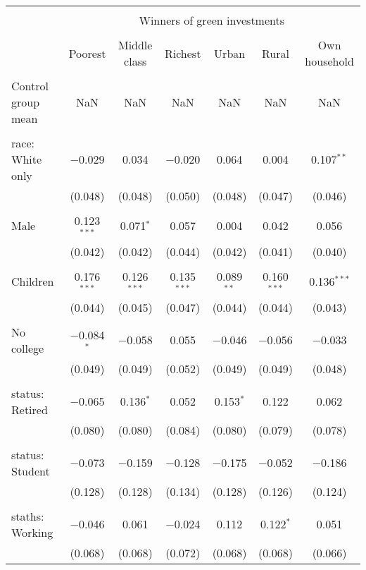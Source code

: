 
\begin{tabular}{@{\extracolsep{5pt}}lcccccc} 
\\[-1.8ex]\hline 
\hline \\[-1.8ex] 
 & \multicolumn{6}{c}{Winners of green investments} \\ 
\cline{2-7} 
\\[-1.8ex] & Poorest & Middle class & Richest & Urban & Rural & Own household \\ 
\hline \\[-1.8ex] 
 Control group mean & NaN & NaN & NaN & NaN & NaN & NaN  \\ \hline \\[-1.8ex] race: White only & $-$0.029 & 0.034 & $-$0.020 & 0.064 & 0.004 & 0.107$^{**}$ \\ 
  & (0.048) & (0.048) & (0.050) & (0.048) & (0.047) & (0.046) \\ 
  & & & & & & \\ 
 Male & 0.123$^{***}$ & 0.071$^{*}$ & 0.057 & 0.004 & 0.042 & 0.056 \\ 
  & (0.042) & (0.042) & (0.044) & (0.042) & (0.041) & (0.040) \\ 
  & & & & & & \\ 
 Children & 0.176$^{***}$ & 0.126$^{***}$ & 0.135$^{***}$ & 0.089$^{**}$ & 0.160$^{***}$ & 0.136$^{***}$ \\ 
  & (0.044) & (0.045) & (0.047) & (0.044) & (0.044) & (0.043) \\ 
  & & & & & & \\ 
 No college & $-$0.084$^{*}$ & $-$0.058 & 0.055 & $-$0.046 & $-$0.056 & $-$0.033 \\ 
  & (0.049) & (0.049) & (0.052) & (0.049) & (0.049) & (0.048) \\ 
  & & & & & & \\ 
 status: Retired & $-$0.065 & 0.136$^{*}$ & 0.052 & 0.153$^{*}$ & 0.122 & 0.062 \\ 
  & (0.080) & (0.080) & (0.084) & (0.080) & (0.079) & (0.078) \\ 
  & & & & & & \\ 
 status: Student & $-$0.073 & $-$0.159 & $-$0.128 & $-$0.175 & $-$0.052 & $-$0.186 \\ 
  & (0.128) & (0.128) & (0.134) & (0.128) & (0.126) & (0.124) \\ 
  & & & & & & \\ 
 staths: Working & $-$0.046 & 0.061 & $-$0.024 & 0.112 & 0.122$^{*}$ & 0.051 \\ 
  & (0.068) & (0.068) & (0.072) & (0.068) & (0.068) & (0.066) \\ 

\end{tabular}
